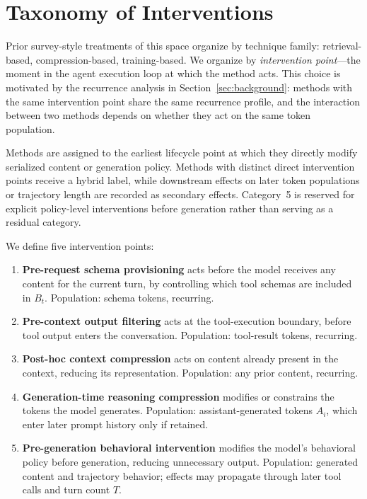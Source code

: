 \documentclass{article}
\begin{document}
\section{Taxonomy of Interventions}
\label{sec:taxonomy}

Prior survey-style treatments of this space organize by technique family: retrieval-based, compression-based, training-based. We organize by \emph{intervention point}---the moment in the agent execution loop at which the method acts. This choice is motivated by the recurrence analysis in Section~\ref{sec:background}: methods with the same intervention point share the same recurrence profile, and the interaction between two methods depends on whether they act on the same token population.

Methods are assigned to the earliest lifecycle point at which they directly modify serialized content or generation policy. Methods with distinct direct intervention points receive a hybrid label, while downstream effects on later token populations or trajectory length are recorded as secondary effects. Category~5 is reserved for explicit policy-level interventions before generation rather than serving as a residual category.

We define five intervention points:
\begin{enumerate}
\item \textbf{Pre-request schema provisioning} acts before the model receives any content for the current turn, by controlling which tool schemas are included in $B_t$. Population: schema tokens, recurring.
\item \textbf{Pre-context output filtering} acts at the tool-execution boundary, before tool output enters the conversation. Population: tool-result tokens, recurring.
\item \textbf{Post-hoc context compression} acts on content already present in the context, reducing its representation. Population: any prior content, recurring.
\item \textbf{Generation-time reasoning compression} modifies or constrains the tokens the model generates. Population: assistant-generated tokens $A_i$, which enter later prompt history only if retained.
\item \textbf{Pre-generation behavioral intervention} modifies the model's behavioral policy before generation, reducing unnecessary output. Population: generated content and trajectory behavior; effects may propagate through later tool calls and turn count $T$.
\end{enumerate}
\end{document}
